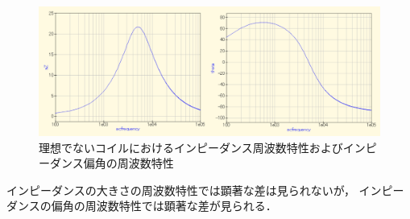 \begin{figure}[H]
    \begin{center}
        \includegraphics[scale=0.5]{not_ideal.pdf}
        \caption{理想でないコイルにおけるインピーダンス周波数特性およびインピーダンス偏角の周波数特性}
    \end{center}
\end{figure}

インピーダンスの大きさの周波数特性では顕著な差は見られないが，
インピーダンスの偏角の周波数特性では顕著な差が見られる．